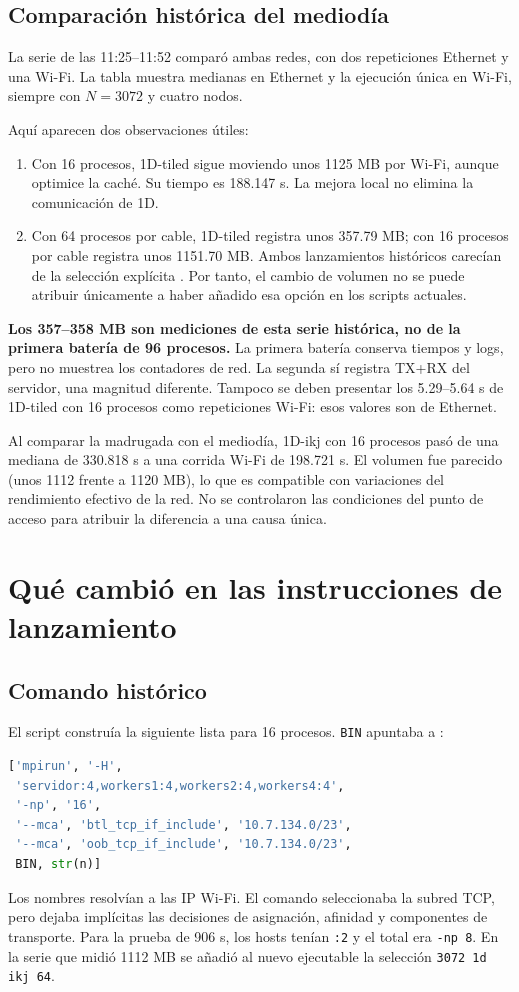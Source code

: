 \subsection{Comparación histórica del mediodía}
La serie de las 11:25--11:52 comparó ambas redes, con dos repeticiones Ethernet y una Wi-Fi. La tabla muestra medianas en Ethernet y la ejecución única en Wi-Fi, siempre con $N=3072$ y cuatro nodos.


Aquí aparecen dos observaciones útiles:
\begin{enumerate}
\item Con 16 procesos, 1D-tiled sigue moviendo unos 1125 MB por Wi-Fi, aunque optimice la caché. Su tiempo es 188.147 s. La mejora local no elimina la comunicación de 1D.
\item Con 64 procesos por cable, 1D-tiled registra unos 357.79 MB; con 16 procesos por cable registra unos 1151.70 MB. Ambos lanzamientos históricos carecían de la selección explícita . Por tanto, el cambio de volumen no se puede atribuir únicamente a haber añadido esa opción en los scripts actuales.
\end{enumerate}

\textbf{Los 357--358 MB son mediciones de esta serie histórica, no de la primera batería de 96 procesos.} La primera batería conserva tiempos y logs, pero no muestrea los contadores de red. La segunda sí registra TX+RX del servidor, una magnitud diferente. Tampoco se deben presentar los 5.29--5.64 s de 1D-tiled con 16 procesos como repeticiones Wi-Fi: esos valores son de Ethernet.

Al comparar la madrugada con el mediodía, 1D-ikj con 16 procesos pasó de una mediana de 330.818 s a una corrida Wi-Fi de 198.721 s. El volumen fue parecido (unos 1112 frente a 1120 MB), lo que es compatible con variaciones del rendimiento efectivo de la red. No se controlaron las condiciones del punto de acceso para atribuir la diferencia a una causa única.

\section{Qué cambió en las instrucciones de lanzamiento}

\subsection{Comando histórico}
El script  construía la siguiente lista para 16 procesos. \texttt{BIN} apuntaba a :
\begin{lstlisting}[language=Python]
['mpirun', '-H',
 'servidor:4,workers1:4,workers2:4,workers4:4',
 '-np', '16',
 '--mca', 'btl_tcp_if_include', '10.7.134.0/23',
 '--mca', 'oob_tcp_if_include', '10.7.134.0/23',
 BIN, str(n)]
\end{lstlisting}
Los nombres resolvían a las IP Wi-Fi. El comando seleccionaba la subred TCP, pero dejaba implícitas las decisiones de asignación, afinidad y componentes de transporte. Para la prueba de 906 s, los hosts tenían \texttt{:2} y el total era \texttt{-np 8}. En la serie que midió 1112 MB se añadió al nuevo ejecutable la selección \texttt{3072 1d ikj 64}.

